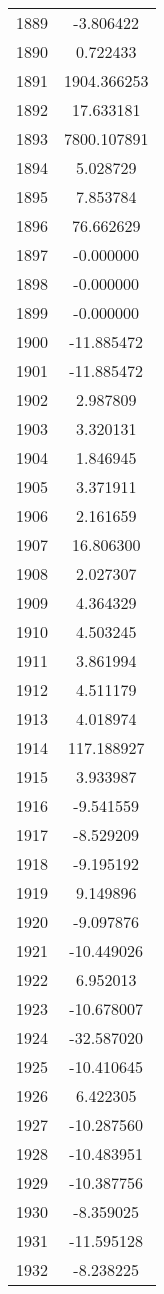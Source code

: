 \documentclass[12pt]{article}
\begin{document}
\begin{longtable}{@{}cc@{}}
1889 & -3.806422 \\
1890 & 0.722433 \\
1891 & 1904.366253 \\
1892 & 17.633181 \\
1893 & 7800.107891 \\
1894 & 5.028729 \\
1895 & 7.853784 \\
1896 & 76.662629 \\
1897 & -0.000000 \\
1898 & -0.000000 \\
1899 & -0.000000 \\
1900 & -11.885472 \\
1901 & -11.885472 \\
1902 & 2.987809 \\
1903 & 3.320131 \\
1904 & 1.846945 \\
1905 & 3.371911 \\
1906 & 2.161659 \\
1907 & 16.806300 \\
1908 & 2.027307 \\
1909 & 4.364329 \\
1910 & 4.503245 \\
1911 & 3.861994 \\
1912 & 4.511179 \\
1913 & 4.018974 \\
1914 & 117.188927 \\
1915 & 3.933987 \\
1916 & -9.541559 \\
1917 & -8.529209 \\
1918 & -9.195192 \\
1919 & 9.149896 \\
1920 & -9.097876 \\
1921 & -10.449026 \\
1922 & 6.952013 \\
1923 & -10.678007 \\
1924 & -32.587020 \\
1925 & -10.410645 \\
1926 & 6.422305 \\
1927 & -10.287560 \\
1928 & -10.483951 \\
1929 & -10.387756 \\
1930 & -8.359025 \\
1931 & -11.595128 \\
1932 & -8.238225 \\

\end{longtable}
\end{document}
